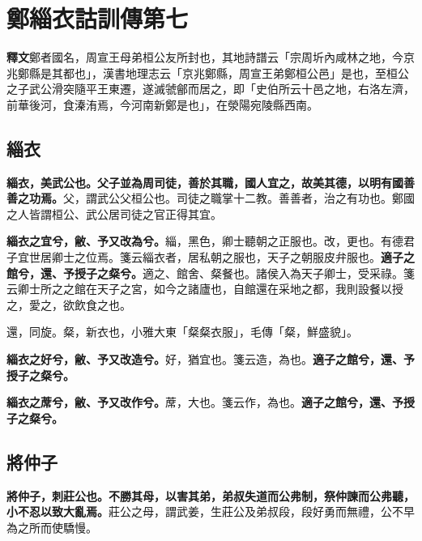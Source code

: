 \chapter{鄭緇衣詁訓傳第七}

\begin{quoting}\textbf{釋文}鄭者國名，周宣王母弟桓公友所封也，其地詩譜云「宗周圻內咸林之地，今京兆鄭縣是其都也」，漢書地理志云「京兆鄭縣，周宣王弟鄭桓公邑」是也，至桓公之子武公滑突隨平王東遷，遂滅虢鄶而居之，即「史伯所云十邑之地，右洛左濟，前華後河，食溱洧焉，今河南新鄭是也」，在滎陽宛陵縣西南。\end{quoting}

\section{緇衣}


\textbf{緇衣，美武公也。父子並為周司徒，善於其職，國人宜之，故美其德，以明有國善善之功焉。}{\footnotesize 父，謂武公父桓公也。司徒之職掌十二教。善善者，治之有功也。鄭國之人皆謂桓公、武公居司徒之官正得其宜。}

\textbf{緇衣之宜兮，敝、予又改為兮。}{\footnotesize 緇，黑色，卿士聽朝之正服也。改，更也。有德君子宜世居卿士之位焉。箋云緇衣者，居私朝之服也，天子之朝服皮弁服也。}\textbf{適子之館兮，還、予授子之粲兮。}{\footnotesize 適之、館舍、粲餐也。諸侯入為天子卿士，受采祿。箋云卿士所之之館在天子之宮，如今之諸廬也，自館還在采地之都，我則設餐以授之，愛之，欲飲食之也。}

\begin{quoting}還，同旋。粲，新衣也，小雅大東「粲粲衣服」，毛傳「粲，鮮盛貌」。\end{quoting}

\textbf{緇衣之好兮，敝、予又改造兮。}{\footnotesize 好，猶宜也。箋云造，為也。}\textbf{適子之館兮，還、予授子之粲兮。}

\textbf{緇衣之蓆兮，敝、予又改作兮。}{\footnotesize 蓆，大也。箋云作，為也。}\textbf{適子之館兮，還、予授子之粲兮。}

\section{將仲子}


\textbf{將仲子，刺莊公也。不勝其母，以害其弟，弟叔失道而公弗制，祭仲諫而公弗聽，小不忍以致大亂焉。}{\footnotesize 莊公之母，謂武姜，生莊公及弟叔段，段好勇而無禮，公不早為之所而使驕慢。}

